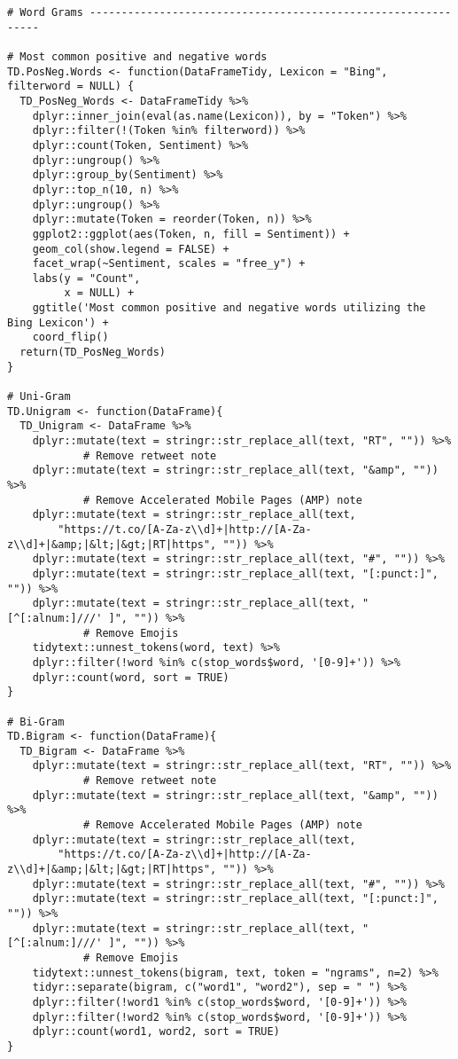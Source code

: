 \begin{lstlisting}
# Word Grams --------------------------------------------------------------

# Most common positive and negative words
TD.PosNeg.Words <- function(DataFrameTidy, Lexicon = "Bing", filterword = NULL) {
  TD_PosNeg_Words <- DataFrameTidy %>%  
    dplyr::inner_join(eval(as.name(Lexicon)), by = "Token") %>% 
    dplyr::filter(!(Token %in% filterword)) %>% 
    dplyr::count(Token, Sentiment) %>%
    dplyr::ungroup() %>% 
    dplyr::group_by(Sentiment) %>%
    dplyr::top_n(10, n) %>%
    dplyr::ungroup() %>%
    dplyr::mutate(Token = reorder(Token, n)) %>%
    ggplot2::ggplot(aes(Token, n, fill = Sentiment)) +
    geom_col(show.legend = FALSE) +
    facet_wrap(~Sentiment, scales = "free_y") +
    labs(y = "Count",
         x = NULL) +
    ggtitle('Most common positive and negative words utilizing the Bing Lexicon') +
    coord_flip()
  return(TD_PosNeg_Words)
}

# Uni-Gram
TD.Unigram <- function(DataFrame){
  TD_Unigram <- DataFrame %>% 
    dplyr::mutate(text = stringr::str_replace_all(text, "RT", "")) %>% 
    		# Remove retweet note
    dplyr::mutate(text = stringr::str_replace_all(text, "&amp", "")) %>% 
    		# Remove Accelerated Mobile Pages (AMP) note
    dplyr::mutate(text = stringr::str_replace_all(text, 
    	"https://t.co/[A-Za-z\\d]+|http://[A-Za-z\\d]+|&amp;|&lt;|&gt;|RT|https", "")) %>% 
    dplyr::mutate(text = stringr::str_replace_all(text, "#", "")) %>% 
    dplyr::mutate(text = stringr::str_replace_all(text, "[:punct:]", "")) %>% 
    dplyr::mutate(text = stringr::str_replace_all(text, "[^[:alnum:]///' ]", "")) %>%  
    		# Remove Emojis
    tidytext::unnest_tokens(word, text) %>%  
    dplyr::filter(!word %in% c(stop_words$word, '[0-9]+')) %>% 
    dplyr::count(word, sort = TRUE)
}

# Bi-Gram
TD.Bigram <- function(DataFrame){
  TD_Bigram <- DataFrame %>% 
    dplyr::mutate(text = stringr::str_replace_all(text, "RT", "")) %>% 
    		# Remove retweet note
    dplyr::mutate(text = stringr::str_replace_all(text, "&amp", "")) %>% 
    		# Remove Accelerated Mobile Pages (AMP) note
    dplyr::mutate(text = stringr::str_replace_all(text, 
    	"https://t.co/[A-Za-z\\d]+|http://[A-Za-z\\d]+|&amp;|&lt;|&gt;|RT|https", "")) %>% 
    dplyr::mutate(text = stringr::str_replace_all(text, "#", "")) %>% 
    dplyr::mutate(text = stringr::str_replace_all(text, "[:punct:]", "")) %>% 
    dplyr::mutate(text = stringr::str_replace_all(text, "[^[:alnum:]///' ]", "")) %>%  
    		# Remove Emojis
    tidytext::unnest_tokens(bigram, text, token = "ngrams", n=2) %>%  
    tidyr::separate(bigram, c("word1", "word2"), sep = " ") %>% 
    dplyr::filter(!word1 %in% c(stop_words$word, '[0-9]+')) %>% 
    dplyr::filter(!word2 %in% c(stop_words$word, '[0-9]+')) %>%
    dplyr::count(word1, word2, sort = TRUE)
}


\end{lstlisting}
